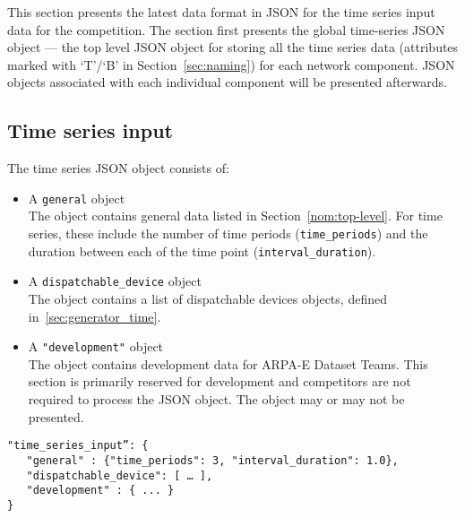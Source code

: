 \label{sec:time_series}
This section presents the latest data format in JSON for the 
time series input data for the competition.
The section first presents the global time-series JSON object --- the
top level JSON object for storing all the time series data 
(attributes marked with `T'/`B' in Section~\ref{sec:naming})
for each network component.
JSON objects associated with each individual component will be presented afterwards.


\subsection{Time series input}
\label{sec:input_data}
The time series JSON object consists of:
\begin{itemize}
    \item A \texttt{general} object\\
    The object contains general data listed
    in Section~\ref{nom:top-level}.
    For time series, these include the number of time periods (\texttt{time\_periods}) and the duration
    between each of the time point (\texttt{interval\_duration}).
    \item A \texttt{dispatchable\_device} object \\
    The object contains a list of dispatchable devices objects, defined in~\ref{sec:generator_time}.
    \item A \texttt{"development"} object\\
    The object contains development data for ARPA-E Dataset Teams. This section is primarily reserved for development and competitors are not required to process the JSON object. The object may or may not be presented. 
\end{itemize}

\begin{verbatim}
"time_series_input”: {
   "general" : {"time_periods": 3, "interval_duration": 1.0},    
   "dispatchable_device": [ … ],
   "development" : { ... }
}    
\end{verbatim}


